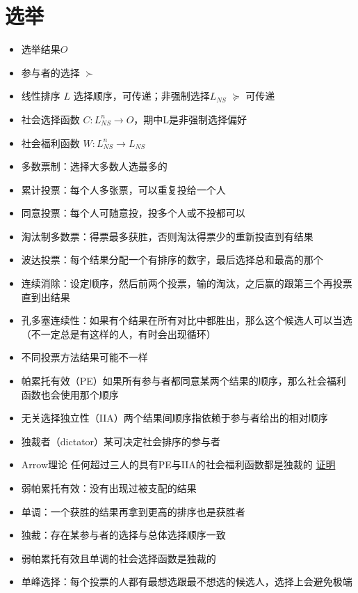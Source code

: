 \documentclass[]{book}
\providecommand{\tightlist}{%
  \setlength{\itemsep}{0pt}\setlength{\parskip}{0pt}}
\begin{document}
\section{选举}

\begin{itemize}
\tightlist
\item
  选举结果\(O\)
\item
  参与者的选择 \(\succ\)
\item
  线性排序 \(L\) 选择顺序，可传递；非强制选择\(L_{NS}\) \(\succeq\) 可传递
\item
  社会选择函数 \(C:L_{NS}^n \rightarrow O\)，期中L是非强制选择偏好
\item
  社会福利函数 \(W:L_{NS}^n \rightarrow L_{NS}\)
\item
  多数票制：选择大多数人选最多的
\item
  累计投票：每个人多张票，可以重复投给一个人
\item
  同意投票：每个人可随意投，投多个人或不投都可以
\item
  淘汰制多数票：得票最多获胜，否则淘汰得票少的重新投直到有结果
\item
  波达投票：每个结果分配一个有排序的数字，最后选择总和最高的那个
\item
  连续消除：设定顺序，然后前两个投票，输的淘汰，之后赢的跟第三个再投票直到出结果
\item
  孔多塞连续性：如果有个结果在所有对比中都胜出，那么这个候选人可以当选（不一定总是有这样的人，有时会出现循环）
\item
  不同投票方法结果可能不一样
\item
  帕累托有效（PE）如果所有参与者都同意某两个结果的顺序，那么社会福利函数也会使用那个顺序
\item
  无关选择独立性（IIA）两个结果间顺序指依赖于参与者给出的相对顺序
\item
  独裁者（dictator）某可决定社会排序的参与者
\item
  Arrow理论 任何超过三人的具有PE与IIA的社会福利函数都是独裁的 \href{https://www.douban.com/group/topic/46208753/}{证明}
\item
  弱帕累托有效：没有出现过被支配的结果
\item
  单调：一个获胜的结果再拿到更高的排序也是获胜者
\item
  独裁：存在某参与者的选择与总体选择顺序一致
\item
  弱帕累托有效且单调的社会选择函数是独裁的
\item
  单峰选择：每个投票的人都有最想选跟最不想选的候选人，选择上会避免极端
\end{itemize}
\end{document}
